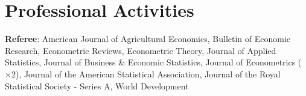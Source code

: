 \documentclass[12pt,letterpaper]{article}
\begin{document}
\section*{Professional Activities}
\textbf{Referee}: American Journal of Agricultural Economics, Bulletin of Economic Research, Econometric Reviews, Econometric Theory, Journal of Applied Statistics, Journal of Business \& Economic Statistics, Journal of Econometrics ($\times 2$), Journal of the American Statistical Association, Journal of the Royal Statistical Society - Series A, World Development 

%
%
%





	
\end{document}
